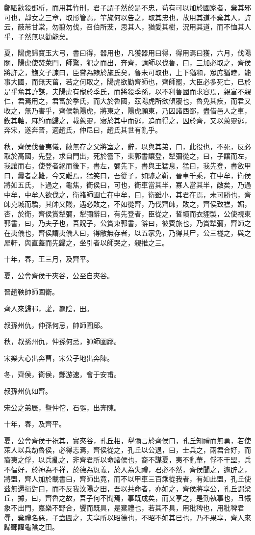 \begin{pinyinscope}
鄭駟歂殺鄧析，而用其竹刑，君子謂子然於是不忠，苟有可以加於國家者，棄其邪可也，靜女之三章，取彤管焉，竿旄何以告之，取其忠也，故用其道不棄其人，詩云，蔽芾甘棠，勿翦勿伐，召伯所茇，思其人，猶愛其樹，況用其道，而不恤其人乎，子然無以勸能矣。

夏，陽虎歸寶玉大弓，書曰得，器用也，凡獲器用曰得，得用焉曰獲，六月，伐陽關，陽虎使焚萊門，師驚，犯之而出，奔齊，請師以伐魯，曰，三加必取之，齊侯將許之，鮑文子諫曰，臣嘗為隸於施氏矣，魯未可取也，上下猶和，眾庶猶睦，能事大國，而無天菑，若之何取之，陽虎欲勤齊師也，齊師罷，大臣必多死亡，已於是乎奮其詐謀，夫陽虎有寵於季氏，而將殺季孫，以不利魯國而求容焉，親富不親仁，君焉用之，君富於季氏，而大於魯國，茲陽虎所欲傾覆也，魯免其疾，而君又收之，無乃害乎，齊侯執陽虎，將東之，陽虎願東，乃囚諸西鄙，盡借邑人之車，鍥其軸，麻約而歸之，載蔥靈，寢於其中而逃，追而得之，囚於齊，又以蔥靈逃，奔宋，遂奔晉，適趙氏，仲尼曰，趙氏其世有亂乎。

秋，齊侯伐晉夷儀，敝無存之父將室之，辭，以與其弟，曰，此役也，不死，反必取於高國，先登，求自門出，死於霤下，東郭書讓登，犁彌從之，曰，子讓而左，我讓而右，使登者絕而後下，書左，彌先下，書與王猛息，猛曰，我先登，書斂甲曰，曩者之難，今又難焉，猛笑曰，吾從子，如驂之靳，晉車千乘，在中牟，衛侯將如五氏，卜過之，龜焦，衛侯曰，可也，衛車當其半，寡人當其半，敵矣，乃過中牟，中牟人欲伐之，衛褚師圃亡在中牟，曰，衛雖小，其君在焉，未可勝也，齊師克城而驕，其帥又賤，遇必敗之，不如從齊，乃伐齊師，敗之，齊侯致禚，媚，杏，於衛，齊侯賞犁彌，犁彌辭曰，有先登者，臣從之，皙幘而衣貍製，公使視東郭書，曰，乃夫子也，吾貺子，公賞東郭書，辭曰，彼賓旅也，乃賞犁彌，齊師之在夷儀也，齊侯謂夷儀人曰，得敝無存者，以五家免，乃得其尸，公三襚之，與之犀軒，與直蓋而先歸之，坐引者以師哭之，親推之三。

十年，春，王三月，及齊平。

夏，公會齊侯于夾谷，公至自夾谷。

晉趙鞅帥師圍衛。

齊人來歸鄆，讙，龜陰，田。

叔孫州仇，仲孫何忌，帥師圍郈。

秋，叔孫州仇，仲孫何忌，帥師圍郈。

宋樂大心出奔曹，宋公子地出奔陳。

冬，齊侯，衛侯，鄭游速，會于安甫。

叔孫州仇如齊。

宋公之弟辰，暨仲佗，石彄，出奔陳。

十年，春，及齊平。

夏，公會齊侯于祝其，實夾谷，孔丘相，犁彌言於齊侯曰，孔丘知禮而無勇，若使萊人以兵劫魯侯，必得志焉，齊侯從之，孔丘以公退，曰，士兵之，兩君合好，而裔夷之俘，以兵亂之，非齊君所以命諸侯也，裔不謀夏，夷不亂華，俘不干盟，兵不偪好，於神為不祥，於德為愆義，於人為失禮，君必不然，齊侯聞之，遽辟之，將盟，齊人加於載書曰，齊師出竟，而不以甲車三百乘從我者，有如此盟，孔丘使茲無還揖對曰，而不反我汶陽之田，吾以共命者，亦如之，齊侯將享公，孔丘謂梁丘，據，曰，齊魯之故，吾子何不聞焉，事既成矣，而又享之，是勤執事也，且犧象不出門，嘉樂不野合，饗而既具，是棄禮也，若其不具，用秕稗也，用秕稗君辱，棄禮名惡，子盍圖之，夫享所以昭德也，不昭不如其已也，乃不果享，齊人來歸鄆讙龜陰之田。


\end{pinyinscope}
